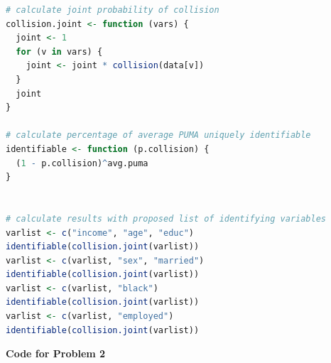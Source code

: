 \documentclass[12pt]{article}
\begin{document}
\begin{lstlisting}[language=R]
# calculate joint probability of collision
collision.joint <- function (vars) {
  joint <- 1
  for (v in vars) {
    joint <- joint * collision(data[v])
  }
  joint
}

# calculate percentage of average PUMA uniquely identifiable
identifiable <- function (p.collision) {
  (1 - p.collision)^avg.puma
}


# calculate results with proposed list of identifying variables
varlist <- c("income", "age", "educ")
identifiable(collision.joint(varlist))
varlist <- c(varlist, "sex", "married")
identifiable(collision.joint(varlist))
varlist <- c(varlist, "black")
identifiable(collision.joint(varlist))
varlist <- c(varlist, "employed")
identifiable(collision.joint(varlist))
\end{lstlisting}

\pagebreak

\textbf{Code for Problem 2}
\end{document}
